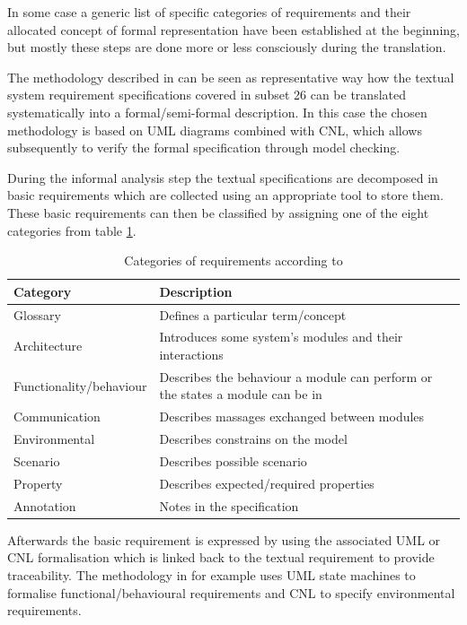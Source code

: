 \documentclass{./template/openetcs_report}
\begin{document}
In some case a generic list of specific categories of requirements and their allocated concept of formal representation have been established at the beginning, but mostly these steps are done more or less consciously during the translation. 

The methodology described in \citep{Cimatti.2008c} can be seen as representative way how the textual system requirement specifications covered in subset 26 can be translated systematically into a formal/semi-formal description. In this case the chosen methodology is based on UML diagrams combined with CNL, which allows subsequently to verify the formal specification through model checking.

During the informal analysis step the textual specifications are decomposed in basic requirements which are collected using an appropriate tool to store them. These basic requirements can then be classified by assigning one of the eight categories from table \ref{tab:categories of requirements}.

\begin{table}[h]

\caption{Categories of requirements according to \citep{Cimatti.2008c}}
\label{tab:categories of requirements}

\begin{tabular}{|p{4.5cm}|p{9.3cm}|}
\hline
\textbf{Category}  &  \textbf{Description} \\ \hline
Glossary & Defines a particular term/concept \\ \hline
Architecture &  Introduces some system's modules and their interactions \\ \hline
Functionality/behaviour & Describes the behaviour a module can perform or the states a module can be in \\ \hline
Communication &  Describes massages exchanged between modules \\\hline
Environmental &  Describes constrains on the model \\\hline
Scenario & Describes possible scenario \\\hline
Property &  Describes expected/required properties \\\hline
Annotation & Notes in the specification\\
\hline
\end{tabular}

\end{table}

Afterwards the basic requirement is expressed by using the associated UML or CNL formalisation which is linked back to the textual requirement  to provide traceability. The methodology in \citep{Cimatti.2008c} for example uses UML state machines to  formalise  functional/behavioural requirements and CNL to specify environmental requirements. 
\end{document}
